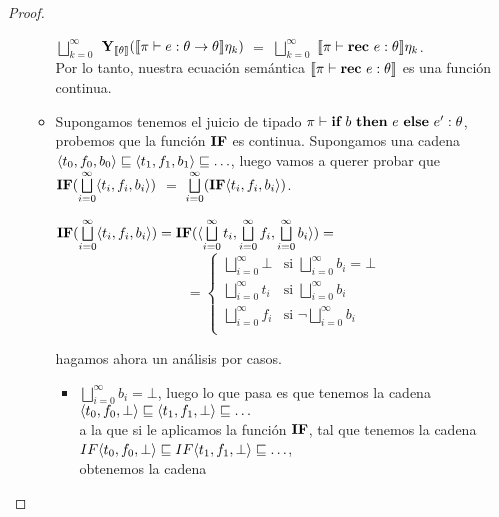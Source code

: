 \begin{proof}
\begin{itemize}
\begin{itemize}
$\bigsqcup\limits^{\infty}_{k=0}$ $\textbf{Y}_{\llbracket \theta \rrbracket}(\llbracket \pi \vdash e : \theta \rightarrow \theta \rrbracket\eta_k)$ $=$ 
$\bigsqcup\limits^{\infty}_{k=0}$ $\llbracket \pi \vdash \textbf{rec} \ e : \theta \rrbracket \eta_k$.\\

Por lo tanto, nuestra ecuaci\'on sem\'antica $\llbracket \pi \vdash \textbf{rec} \ e : \theta \rrbracket$ es
una funci\'on continua.

\item Supongamos tenemos el juicio de tipado $\pi \vdash \textbf{if} \ b \ \textbf{then} \ e \ \textbf{else} \ e' : \theta$, 
probemos que la funci\'on $\textbf{IF}$ es continua. Supongamos una cadena 
$\langle t_0,f_0,b_0 \rangle \sqsubseteq \langle t_1,f_1,b_1 \rangle \sqsubseteq \ldots$, luego
vamos a querer probar que $\textbf{IF} (\bigsqcup\limits^{\infty}_{i=0}\langle t_i,f_i,b_i \rangle)$ $=$
$\bigsqcup\limits^{\infty}_{i=0} (\textbf{IF} \langle t_i,f_i,b_i \rangle)$.


$\textbf{IF} (\bigsqcup\limits^{\infty}_{i=0}\langle t_i,f_i,b_i \rangle) =
\textbf{IF} (\langle \bigsqcup\limits^{\infty}_{i=0}t_i
    ,\bigsqcup\limits^{\infty}_{i=0}f_i
    ,\bigsqcup\limits^{\infty}_{i=0}b_i \rangle) =$
\[
=
\begin{cases}
\bigsqcup\limits^{\infty}_{i=0} \bot & \text{si } \bigsqcup\limits^{\infty}_{i=0}b_i = \bot \\
\bigsqcup\limits^{\infty}_{i=0}t_i & \text{si } \bigsqcup\limits^{\infty}_{i=0}b_i\\
\bigsqcup\limits^{\infty}_{i=0}f_i & \text{si } \neg \bigsqcup\limits^{\infty}_{i=0}b_i\\
\end{cases}
\]

hagamos ahora un an\'alisis por casos.

\begin{itemize}
\item $\bigsqcup\limits^{\infty}_{i=0}b_i = \bot$, luego lo que pasa es que tenemos
la cadena \\

$\langle t_0,f_0,\bot \rangle \sqsubseteq \langle t_1,f_1,\bot \rangle \sqsubseteq \ldots$ \\

a la que si le aplicamos la funci\'on $\textbf{IF}$, tal que tenemos la cadena \\

$IF \langle t_0,f_0,\bot \rangle \sqsubseteq IF \langle t_1,f_1,\bot \rangle \sqsubseteq \ldots$, \\

obtenemos la cadena\\


\end{itemize}
\end{itemize}
\end{itemize}
\end{proof}
